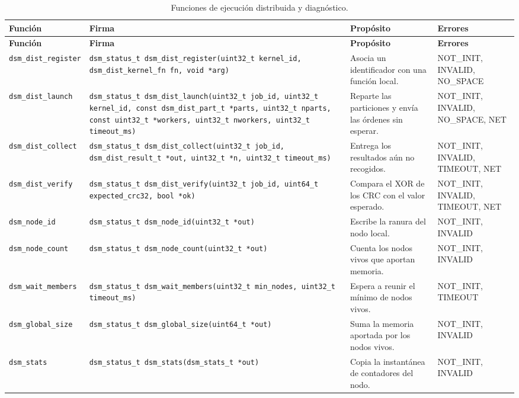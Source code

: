 {\scriptsize
\begin{xltabular}{\linewidth}{l P{5.4cm} Y >{\RaggedRight\arraybackslash{}}p{2.7cm}}
\caption{Funciones de ejecución distribuida y diagnóstico.}\label{tab:funciones-dist}\\
\toprule
\textbf{Función} & \textbf{Firma} & \textbf{Propósito} & \textbf{Errores} \\
\midrule
\endfirsthead
\toprule
\textbf{Función} & \textbf{Firma} & \textbf{Propósito} & \textbf{Errores} \\
\midrule
\endhead
\texttt{dsm\_dist\_register} & \texttt{dsm\_status\_t dsm\_dist\_register(uint32\_t kernel\_id, dsm\_dist\_kernel\_fn fn, void *arg)} & Asocia un identificador con una función local. & NOT\_INIT, INVALID, NO\_SPACE \\
\texttt{dsm\_dist\_launch} & \texttt{dsm\_status\_t dsm\_dist\_launch(uint32\_t job\_id, uint32\_t kernel\_id, const dsm\_dist\_part\_t *parts, uint32\_t nparts, const uint32\_t *workers, uint32\_t nworkers, uint32\_t timeout\_ms)} & Reparte las particiones y envía las órdenes sin esperar. & NOT\_INIT, INVALID, NO\_SPACE, NET \\
\texttt{dsm\_dist\_collect} & \texttt{dsm\_status\_t dsm\_dist\_collect(uint32\_t job\_id, dsm\_dist\_result\_t *out, uint32\_t *n, uint32\_t timeout\_ms)} & Entrega los resultados aún no recogidos. & NOT\_INIT, INVALID, TIMEOUT, NET \\
\texttt{dsm\_dist\_verify} & \texttt{dsm\_status\_t dsm\_dist\_verify(uint32\_t job\_id, uint64\_t expected\_crc32, bool *ok)} & Compara el XOR de los CRC con el valor esperado. & NOT\_INIT, INVALID, TIMEOUT, NET \\
\texttt{dsm\_node\_id} & \texttt{dsm\_status\_t dsm\_node\_id(uint32\_t *out)} & Escribe la ranura del nodo local. & NOT\_INIT, INVALID \\
\texttt{dsm\_node\_count} & \texttt{dsm\_status\_t dsm\_node\_count(uint32\_t *out)} & Cuenta los nodos vivos que aportan memoria. & NOT\_INIT, INVALID \\
\texttt{dsm\_wait\_members} & \texttt{dsm\_status\_t dsm\_wait\_members(uint32\_t min\_nodes, uint32\_t timeout\_ms)} & Espera a reunir el mínimo de nodos vivos. & NOT\_INIT, TIMEOUT \\
\texttt{dsm\_global\_size} & \texttt{dsm\_status\_t dsm\_global\_size(uint64\_t *out)} & Suma la memoria aportada por los nodos vivos. & NOT\_INIT, INVALID \\
\texttt{dsm\_stats} & \texttt{dsm\_status\_t dsm\_stats(dsm\_stats\_t *out)} & Copia la instantánea de contadores del nodo. & NOT\_INIT, INVALID \\

\end{xltabular}}
